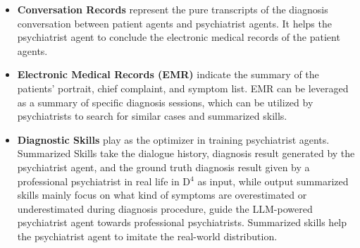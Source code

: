 \begin{itemize}
    \item \textbf{Conversation Records} represent the pure transcripts of the diagnosis conversation between patient agents and psychiatrist agents. It helps the psychiatrist agent to conclude the electronic medical records of the patient agents. 
    \item \textbf{Electronic Medical Records (EMR)} indicate the summary of the patients' portrait, chief complaint, and symptom list. EMR can be leveraged as a summary of specific diagnosis sessions, which can be utilized by psychiatrists to search for similar cases and summarized skills.
    \item\textbf{Diagnostic Skills} play as the optimizer in training psychiatrist agents. Summarized Skills take the dialogue history, diagnosis result generated by the psychiatrist agent, and the ground truth diagnosis result given by a professional psychiatrist in real life in D$^4$ as input, while output summarized skills mainly focus on what kind of symptoms are overestimated or underestimated during diagnosis procedure, guide the LLM-powered psychiatrist agent towards professional psychiatrists. Summarized skills help the psychiatrist agent to imitate the real-world distribution.
\end{itemize}

